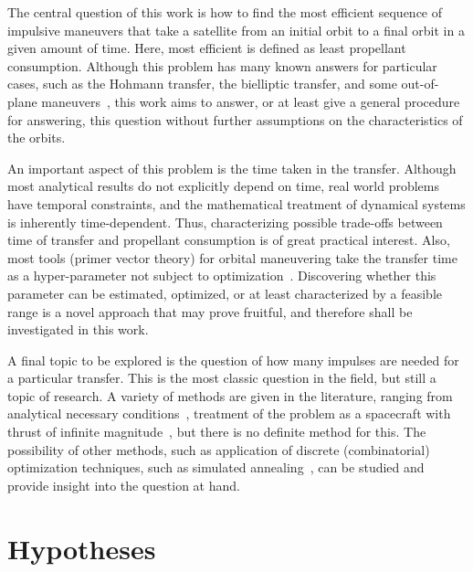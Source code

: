 The central question of this work is how to find the most efficient sequence of impulsive maneuvers that take a satellite from an initial orbit to a final orbit in a given amount of time. Here, most efficient is defined as least propellant consumption. Although this problem has many known answers for particular cases, such as the Hohmann transfer, the bielliptic transfer, and some out-of-plane maneuvers~\cite{chobotov}, this work aims to answer, or at least give a general procedure for answering, this question without further assumptions on the characteristics of the orbits. 

An important aspect of this problem is the time taken in the transfer. Although most analytical results do not explicitly depend on time, real world problems have temporal constraints, and the mathematical treatment of dynamical systems is inherently time-dependent. Thus, characterizing possible trade-offs between time of transfer and propellant consumption is of great practical interest. Also, most tools (primer vector theory) for orbital maneuvering take the transfer time as a hyper-parameter not subject to optimization~\cite{Conway_2010}. Discovering whether this parameter can be estimated, optimized, or at least characterized by a feasible range is a novel approach that may prove fruitful, and therefore shall be investigated in this work.

A final topic to be explored is the question of how many impulses are needed for a particular transfer. This is the most classic question in the field, but still a topic of research. A variety of methods are given in the literature, ranging from analytical necessary conditions~\cite{interactive_primer_vector}, treatment of the problem as a spacecraft with thrust of infinite magnitude~\cite{how_many_impulses}, but there is no definite method for this. The possibility of other methods, such as application of discrete (combinatorial) optimization techniques, such as simulated annealing~\cite{numerical_recipes}, can be studied and provide insight into the question at hand.











\section{Hypotheses}




